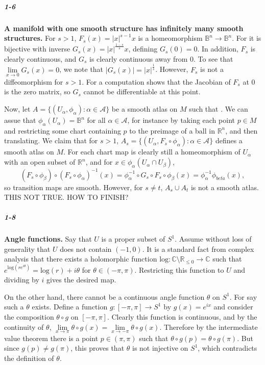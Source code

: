 \documentclass[10pt,letter]{article}
\begin{document}
\subparagraph{1-6} \textbf{A manifold with one smooth structure has infinitely many smooth structures.} For $s > 1$, $F_s(x) = \vert x \vert^{s-1}x$ is a homeomorphism $\mathbb{B}^n \rightarrow \mathbb{B}^n$. For it is bijective with inverse $G_s(x) = \vert x \vert^{\frac{1-s}{s}} x$, defining $G_s(0) = 0$. In addition, $F_s$ is clearly continuous, and $G_s$ is clearly continuous away from $0$. To see that $\lim \limits_{x \rightarrow 0} G_s(x) = 0$, we note that $\vert G_s(x) \vert = \vert x \vert^{\frac{1}{s}}$. However, $F_s$ is not a diffeomorphism for $s > 1$. For a computation shows that the Jacobian of $F_s$ at $0$ is the zero matrix, so $G_s$ cannot be differentiable at this point.

Now, let $A = \lbrace (U_{\alpha},\phi_{\alpha}): \alpha \in \mathcal{A} \rbrace$ be a smooth atlas on $M$ such that . We can assue that $\phi_{\alpha}(U_\alpha) = \mathbb{B}^n$ for all $\alpha \in \mathcal{A}$, for instance by taking each point $p \in M$ and restricting some chart containing $p$ to the preimage of a ball in $\mathbb{R}^n$, and then translating. We claim that for $s > 1$, $A_s = \lbrace (U_{\alpha},F_s \circ \phi_{\alpha}): \alpha \in \mathcal{A} \rbrace$ defines a smooth atlas on $M$. For each chart map is clearly still a homeomorphism of $U_{\alpha}$ with an open subset of $\mathbb{R}^n$, and for $x \in \phi_{\alpha}(U_{\alpha} \cap U_{\beta})$, 
\begin{equation*}
(F_s \circ \phi_{\beta}) \circ (F_s \circ \phi_{\alpha})^{-1} (x) = \phi_{\alpha}^{-1} \circ G_s \circ F_s \circ \phi_{\beta}(x) = \phi_{\alpha}^{-1}  \phi_{beta}(x),
\end{equation*}
so transition maps are smooth. However, for $s \neq t$,  $A_s \cup A_t$ is not a smooth atlas. THIS NOT TRUE. HOW TO FINISH?

\subparagraph{1-8} \textbf{Angle functions.} Say that $U$ is a proper subset of $S^1$. Assume without loss of generality that $U$ does not contain $(-1,0)$. It is a standard fact from complex analysis that there exists a holomorphic function $\text{log}: \mathbb{C} \setminus \mathbb{R}_{\leq 0} \rightarrow \mathbb{C}$ such that $e^{\text{log}(re^{i\theta})} = \text{log}(r) + i\theta$ for $\theta \in (-\pi,\pi)$. Restricting this function to $U$ and dividing by $i$ gives the desired map. 

On the other hand, there cannot be a continuous angle function  $\theta$  on $S^1$.  For say such a $\theta$ exists. Define a function $g: [-\pi,\pi] \rightarrow S^1$ by $g(x) = e^{ix}$ and consider the composition $\theta \circ g$ on $[-\pi,\pi]$. Clearly this function is continuous, and by the continuity of $\theta$, $\lim \limits_{x \rightarrow \pi} \theta \circ g(x) = \lim \limits_{x \rightarrow -\pi} \theta \circ g(x)$. Therefore by the intermediate value theorem there is a point $p \in (\pi,\pi)$ such that $\theta \circ g(p) = \theta \circ g(\pi)$. But since $g(p) \neq g(\pi)$, this proves that $\theta$ is not injective on $S^1$, which contradicts the definition of $\theta$.
\end{document}
